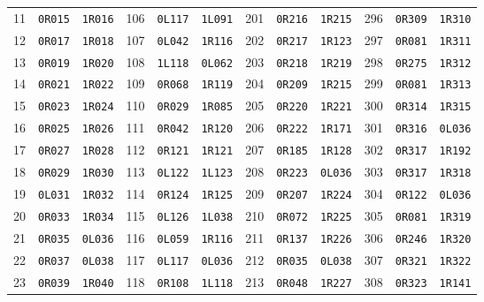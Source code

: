 \documentclass[11pt,letterpaper]{article}
\begin{document}
\begin{longtable}{@{}rll@{\qquad}rll@{\qquad}rll@{\qquad}rll@{}}
11 & \texttt{0R015} & \texttt{1R016} & 106 & \texttt{0L117} & \texttt{1L091} & 201 & \texttt{0R216} & \texttt{1R215} & 296 & \texttt{0R309} & \texttt{1R310} \\
12 & \texttt{0R017} & \texttt{1R018} & 107 & \texttt{0L042} & \texttt{1R116} & 202 & \texttt{0R217} & \texttt{1R123} & 297 & \texttt{0R081} & \texttt{1R311} \\
13 & \texttt{0R019} & \texttt{1R020} & 108 & \texttt{1L118} & \texttt{0L062} & 203 & \texttt{0R218} & \texttt{1R219} & 298 & \texttt{0R275} & \texttt{1R312} \\
14 & \texttt{0R021} & \texttt{1R022} & 109 & \texttt{0R068} & \texttt{1R119} & 204 & \texttt{0R209} & \texttt{1R215} & 299 & \texttt{0R081} & \texttt{1R313} \\
15 & \texttt{0R023} & \texttt{1R024} & 110 & \texttt{0R029} & \texttt{1R085} & 205 & \texttt{0R220} & \texttt{1R221} & 300 & \texttt{0R314} & \texttt{1R315} \\
16 & \texttt{0R025} & \texttt{1R026} & 111 & \texttt{0R042} & \texttt{1R120} & 206 & \texttt{0R222} & \texttt{1R171} & 301 & \texttt{0R316} & \texttt{0L036} \\
17 & \texttt{0R027} & \texttt{1R028} & 112 & \texttt{0R121} & \texttt{1R121} & 207 & \texttt{0R185} & \texttt{1R128} & 302 & \texttt{0R317} & \texttt{1R192} \\
18 & \texttt{0R029} & \texttt{1R030} & 113 & \texttt{0L122} & \texttt{1L123} & 208 & \texttt{0R223} & \texttt{0L036} & 303 & \texttt{0R317} & \texttt{1R318} \\
19 & \texttt{0L031} & \texttt{1R032} & 114 & \texttt{0R124} & \texttt{1R125} & 209 & \texttt{0R207} & \texttt{1R224} & 304 & \texttt{0R122} & \texttt{0L036} \\
20 & \texttt{0R033} & \texttt{1R034} & 115 & \texttt{0L126} & \texttt{1L038} & 210 & \texttt{0R072} & \texttt{1R225} & 305 & \texttt{0R081} & \texttt{1R319} \\
21 & \texttt{0R035} & \texttt{0L036} & 116 & \texttt{0L059} & \texttt{1R116} & 211 & \texttt{0R137} & \texttt{1R226} & 306 & \texttt{0R246} & \texttt{1R320} \\
22 & \texttt{0R037} & \texttt{0L038} & 117 & \texttt{0L117} & \texttt{0L036} & 212 & \texttt{0R035} & \texttt{0L038} & 307 & \texttt{0R321} & \texttt{1R322} \\
23 & \texttt{0R039} & \texttt{1R040} & 118 & \texttt{0R108} & \texttt{1L118} & 213 & \texttt{0R048} & \texttt{1R227} & 308 & \texttt{0R323} & \texttt{1R141} \\

\end{longtable}
\end{document}
